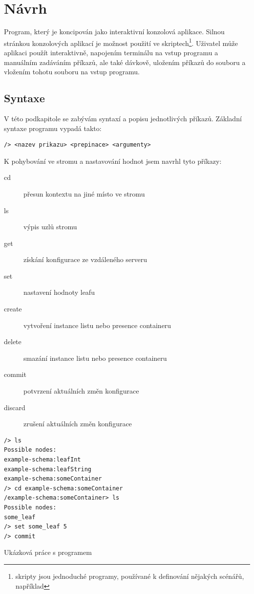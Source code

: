 \documentclass[thesis=B,czech,hidelinks]{FITthesis}[2019/03/06]
\begin{document}
\chapter{Návrh}
Program, který  je koncipován jako interaktivní konzolová aplikace. Silnou stránkou konzolových aplikací je možnost použití ve skriptech\footnote{skripty jsou jednoduché programy, používané k definování nějakých scénářů, například }. Uživatel může aplikaci použít interaktivně, napojením terminálu na vstup programu a manuálním zadáváním příkazů, ale také dávkově, uložením příkazů do souboru a vložením tohotu souboru na vstup programu.


\section{Syntaxe}
V této podkapitole se zabývám syntaxí a popisu jednotlivých příkazů. Základní syntaxe programu vypadá takto:
\begin{verbatim}
/> <nazev prikazu> <prepinace> <argumenty>
\end{verbatim}
K pohybování ve stromu a nastavování hodnot jsem navrhl tyto příkazy:

\begin{description}
\item[cd]{přesun kontextu na jiné místo ve stromu}
\item[ls]{výpis uzlů stromu}
\item[get]{získání konfigurace ze vzdáleného serveru}
\item[set]{nastavení hodnoty leafu}
\item[create]{vytvoření instance listu nebo presence containeru}
\item[delete]{smazání instance listu nebo presence containeru}
\item[commit]{potvrzení aktuálních změn konfigurace}
\item[discard]{zrušení aktuálních změn konfigurace}
\end{description}

\begin{listing}
\begin{verbatim}
/> ls
Possible nodes:
example-schema:leafInt
example-schema:leafString
example-schema:someContainer
/> cd example-schema:someContainer
/example-schema:someContainer> ls
Possible nodes:
some_leaf
/> set some_leaf 5
/> commit
\end{verbatim}
\caption{Ukázková práce s programem}\label{ukazka}
\end{listing}
\end{document}
